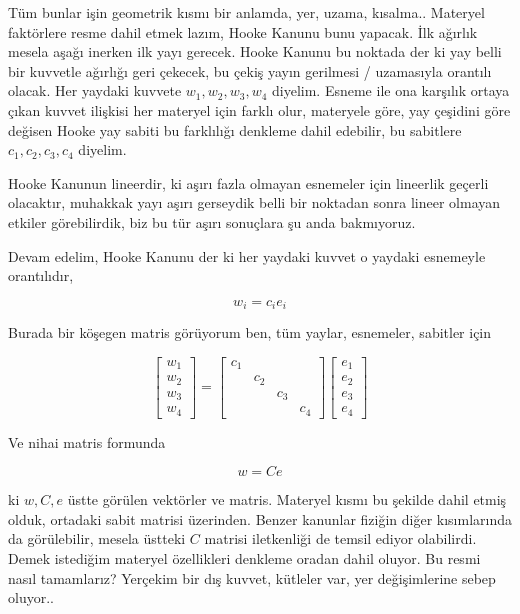 \documentclass[12pt,fleqn]{article}\usepackage{../../common}
\begin{document}
Tüm bunlar işin geometrik kısmı bir anlamda, yer, uzama, kısalma.. Materyel
faktörlere resme dahil etmek lazım, Hooke Kanunu bunu yapacak. İlk ağırlık
mesela aşağı inerken ilk yayı gerecek. Hooke Kanunu bu noktada der ki yay belli
bir kuvvetle ağırlığı geri çekecek, bu çekiş yayın gerilmesi / uzamasıyla
orantılı olacak. Her yaydaki kuvvete $w_1,w_2,w_3,w_4$ diyelim. Esneme ile ona
karşılık ortaya çıkan kuvvet ilişkisi her materyel için farklı olur, materyele
göre, yay çeşidini göre değisen Hooke yay sabiti bu farklılığı denkleme dahil
edebilir, bu sabitlere $c_1,c_2,c_3,c_4$ diyelim.

Hooke Kanunun lineerdir, ki aşırı fazla olmayan esnemeler için lineerlik
geçerli olacaktır, muhakkak yayı aşırı gerseydik belli bir noktadan sonra
lineer olmayan etkiler görebilirdik, biz bu tür aşırı sonuçlara şu anda
bakmıyoruz.

Devam edelim, Hooke Kanunu der ki her yaydaki kuvvet o yaydaki esnemeyle orantılıdır,

$$
w_i = c_i e_i 
$$

Burada bir köşegen matris görüyorum ben, tüm yaylar, esnemeler, sabitler için

$$
\left[\begin{array}{c}
w_1 \\ w_2 \\ w_3 \\ w_4
\end{array}\right] =
\left[\begin{array}{cccc}
c_1 & & & \\  & c_2 & & \\  & & c_3 & \\ & & & c_4
\end{array}\right]
\left[\begin{array}{c}
e_1 \\ e_2 \\ e_3 \\ e_4
\end{array}\right] 
$$

Ve nihai matris formunda

$$
w = C e
$$

ki $w,C,e$ üstte görülen vektörler ve matris. Materyel kısmı bu şekilde dahil
etmiş olduk, ortadaki sabit matrisi üzerinden. Benzer kanunlar fiziğin diğer
kısımlarında da görülebilir, mesela üstteki $C$ matrisi iletkenliği de temsil
ediyor olabilirdi. Demek istediğim materyel özellikleri denkleme oradan dahil
oluyor. Bu resmi nasıl tamamlarız? Yerçekim bir dış kuvvet, kütleler var, yer
değişimlerine sebep oluyor..
\end{document}
